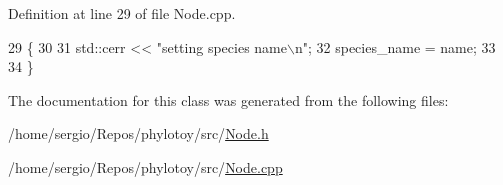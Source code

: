 Definition at line 29 of file Node.\+cpp.


\begin{DoxyCode}
29                                        \{
30   
31   std::cerr << \textcolor{stringliteral}{"setting species name\(\backslash\)n"};
32   species\_name = name;
33   
34 \}
\end{DoxyCode}


The documentation for this class was generated from the following files\+:\begin{DoxyCompactItemize}
\item 
/home/sergio/\+Repos/phylotoy/src/\hyperlink{Node_8h}{Node.\+h}\item 
/home/sergio/\+Repos/phylotoy/src/\hyperlink{Node_8cpp}{Node.\+cpp}\end{DoxyCompactItemize}
